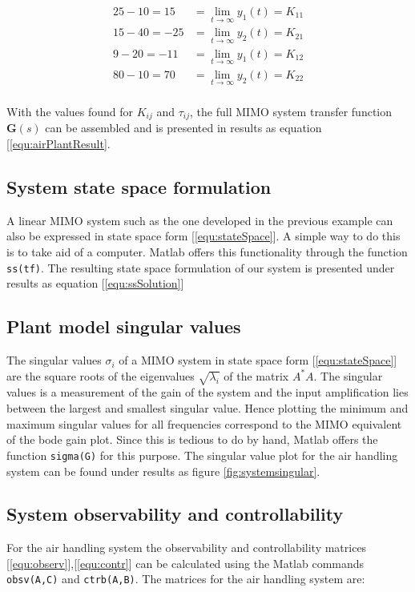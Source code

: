 \documentclass[a4paper, titlepage]{article}
\begin{document}
\begin{equation}
\begin{split}
25 - 10 = 15 &= 
\lim_{t \to \infty} y_{1}(t) = 
K_{11} \\
15 - 40 = -25 &= 
\lim_{t \to \infty} y_{2}(t) = 
K_{21} \\
9 - 20 = -11 &= 
\lim_{t \to \infty} y_{1}(t) = 
K_{12} \\
80 - 10 = 70 &= 
\lim_{t \to \infty} y_{2}(t) = 
K_{22} \\
\end{split}
\end{equation}

With the values found for $K_{ij}$ and $\tau_{ij}$, the full MIMO system transfer function $\boldsymbol{G}(s)$ can be assembled and is presented in results as equation [\ref{equ:airPlantResult}.

\subsection{System state space formulation}
\label{sec:stateSpace}
A linear MIMO system such as the one developed in the previous example can also be expressed in state space form [\ref{equ:stateSpace}].
A simple way to do this is to take aid of a computer.
Matlab offers this functionality through the function \verb|ss(tf)|.
The resulting state space formulation of our system is presented under results as equation [\ref{equ:ssSolution}]

\subsection{Plant model singular values}
\label{sec:plantSingularValues}
The singular values $\sigma_i$ of a MIMO system in state space form [\ref{equ:stateSpace}] are the square roots of the eigenvalues $\sqrt{\lambda_i}$ of the matrix $A^*A$.
The singular values is a measurement of the gain of the system and the input amplification lies between the largest and smallest singular value.
Hence plotting the minimum and maximum singular values for all frequencies correspond to the MIMO equivalent of the bode gain plot.
Since this is tedious to do by hand, Matlab offers the function \verb|sigma(G)| for this purpose.
The singular value plot for the air handling system can be found under results as figure \ref{fig:systemsingular}.

\subsection{System observability and controllability}
For the air handling system the observability and controllability matrices [\ref{equ:observ}],[\ref{equ:contr}] can be calculated using the Matlab commands \verb|obsv(A,C)| and \verb|ctrb(A,B)|.
The matrices for the air handling system are:
\end{document}
